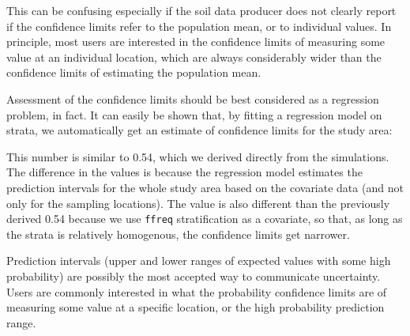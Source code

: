 \documentclass[11pt]{krantz}
\makeatletter
\newenvironment{Shaded}{\begin{snugshade}}{\end{snugshade}}
\newcommand{\CommentTok}[1]{\textcolor[rgb]{0.37,0.37,0.37}{\textit{#1}}}
\newcommand{\DataTypeTok}[1]{\textcolor[rgb]{0.27,0.27,0.27}{#1}}
\newcommand{\DecValTok}[1]{\textcolor[rgb]{0.06,0.06,0.06}{#1}}
\newcommand{\KeywordTok}[1]{\textcolor[rgb]{0.27,0.27,0.27}{\textbf{#1}}}
\newcommand{\NormalTok}[1]{#1}
\newcommand{\OperatorTok}[1]{\textcolor[rgb]{0.43,0.43,0.43}{\textbf{#1}}}
\newcommand{\OtherTok}[1]{\textcolor[rgb]{0.37,0.37,0.37}{#1}}
\newcommand{\StringTok}[1]{\textcolor[rgb]{0.5,0.5,0.5}{#1}}
\newenvironment{kframe}{%
\medskip{}
\setlength{\fboxsep}{.8em}
 \def\at@end@of@kframe{}%
 \ifinner\ifhmode%
  \def\at@end@of@kframe{\end{minipage}}%
  \begin{minipage}{\columnwidth}%
 \fi\fi%
 \def\FrameCommand##1{\hskip\@totalleftmargin \hskip-\fboxsep
 \colorbox{shadecolor}{##1}\hskip-\fboxsep
     \hskip-\linewidth \hskip-\@totalleftmargin \hskip\columnwidth}%
 \MakeFramed {\advance\hsize-\width
   \@totalleftmargin\z@ \linewidth\hsize
   \@setminipage}}%
 {\par\unskip\endMakeFramed%
 \at@end@of@kframe}
\newenvironment{rmdblock}[1]
  {
  \begin{itemize}
  \renewcommand{\labelitemi}{
    \raisebox{-.7\height}[0pt][0pt]{
      {\setkeys{Gin}{width=3em,keepaspectratio}\texttt{[image: images/\#1]}}
    }
  }
  \setlength{\fboxsep}{1em}
  \begin{kframe}
  \item
  }
  {
  \end{kframe}
  \end{itemize}
  }
\newenvironment{rmdnote}
  {\begin{rmdblock}{note}}
  {\end{rmdblock}}
\theoremstyle{definition}
\theoremstyle{definition}
\theoremstyle{definition}
\theoremstyle{remark}
\makeatother
\begin{document}
This can be confusing especially if the soil data producer does not
clearly report if the confidence limits refer to the population mean, or
to individual values. In principle, most users are interested in the
confidence limits of measuring some value at an individual location,
which are always considerably wider than the confidence limits of
estimating the population mean.

Assessment of the confidence limits should be best considered as a
regression problem, in fact. It can easily be shown that, by fitting a
regression model on strata, we automatically get an estimate of
confidence limits for the study area:

\begin{Shaded}
\end{Shaded}

This number is similar to 0.54, which we derived directly from the
simulations. The difference in the values is because the regression
model estimates the prediction intervals for the whole study area based
on the covariate data (and not only for the sampling locations). The
value is also different than the previously derived 0.54 because we use
\texttt{ffreq} stratification as a covariate, so that, as long as the
strata is relatively homogenous, the confidence limits get narrower.

\begin{rmdnote}
Prediction intervals (upper and lower ranges of expected values with
some high probability) are possibly the most accepted way to communicate
uncertainty. Users are commonly interested in what the probability
confidence limits are of measuring some value at a specific location, or
the high probability prediction range.
\end{rmdnote}
\end{document}
